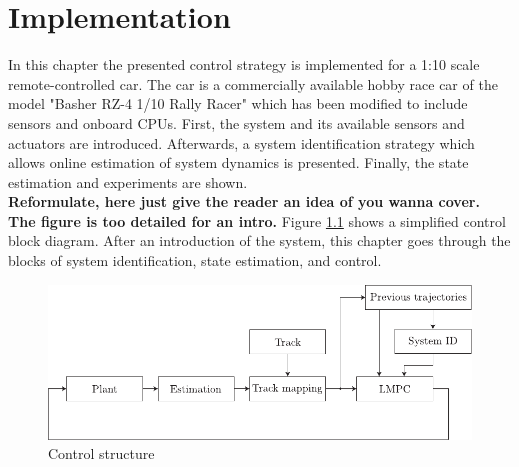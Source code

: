 \chapter{Implementation}
In this chapter the presented control strategy is implemented for a 1:10 scale remote-controlled car. The car is a commercially available hobby race car of the model "Basher RZ-4 1/10 Rally Racer" which has been modified to include sensors and onboard CPUs. First, the system and its available sensors and actuators are introduced. Afterwards, a system identification strategy which allows online estimation of system dynamics is presented. Finally, the state estimation and experiments are shown.\\
{\bfseries{Reformulate, here just give the reader an idea of you wanna cover. The figure is too detailed for an intro.}}
Figure \ref{fig:controlStructure} shows a simplified control block diagram. After an introduction of the system, this chapter goes through the blocks of system identification, state estimation, and control.
\begin{figure}[ht]
    \centering
  \includegraphics{../../Figures/Illustrator/ControlDiagram.pdf}
    \caption{Control structure}
    \label{fig:controlStructure}
\end{figure}

